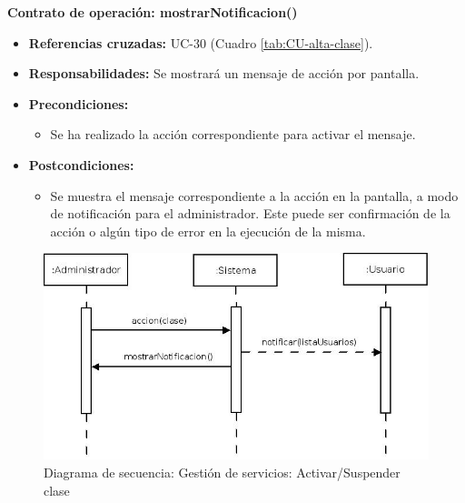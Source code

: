 \textbf{Contrato de operación: mostrarNotificacion()}
\begin{itemize}
\item \textbf{Referencias cruzadas:} UC-30 (Cuadro \ref{tab:CU-alta-clase}).
\item \textbf{Responsabilidades:} Se mostrará un mensaje de acción por pantalla.
\item \textbf{Precondiciones:} 
 \begin{itemize}
\item Se ha realizado la acción correspondiente para activar el mensaje.
\end {itemize}
\item \textbf{Postcondiciones:} 
 \begin{itemize}
\item Se muestra el mensaje correspondiente a la acción en la pantalla, a modo de notificación para el administrador. Este puede ser confirmación de la acción o algún tipo de error en la ejecución de la misma.
\end {itemize}
\end {itemize}


\vspace{10mm}

\begin{figure}[H]
\centering
  \includegraphics[scale=.55]{img/secuencias/gestion-servicios-suspender-activar-clase.jpeg}
  \caption{Diagrama de secuencia: Gestión de servicios: Activar/Suspender clase}
  \label{fig:secuencia-gestion-servicios-suspender-activar-clase}
\end{figure}

